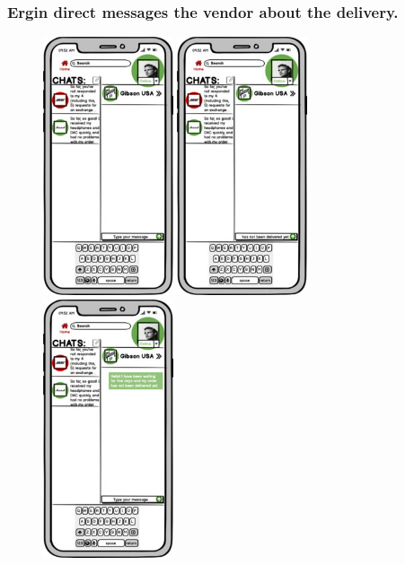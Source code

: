 \documentclass[]{article}
\begin{document}
\hypertarget{ergin-direct-messages-the-vendor-about-the-delivery.}{%
    \subsubsection{Ergin direct messages the vendor about the
        delivery.}\label{ergin-direct-messages-the-vendor-about-the-delivery.}}

\begin{figure}[H]
    \centering
    \includegraphics[height=3in]{./images/21.jpg}
    \includegraphics[height=3in]{./images/22.jpg}
    \includegraphics[height=3in]{./images/23.jpg}
\end{figure}
\end{document}
